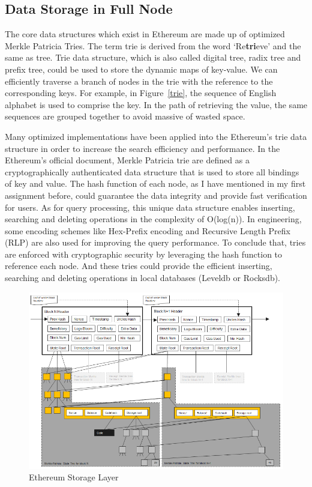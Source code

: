 \documentclass[conference]{IEEEtran}
\begin{document}
\subsection{Data Storage in Full Node}
The core data structures which exist in Ethereum are made up of optimized Merkle Patricia Tries.
%
The term trie is derived from the word `Re{\textbf{tri}}eve' and the same as tree. 
%
Trie data structure, which is also called digital tree, radix tree and prefix tree, could be used to store the dynamic maps of key-value.  
%
We can efficiently traverse a branch of nodes in the trie with the reference to the corresponding keys.
%
For example, in Figure~\ref{trie}, the sequence of English alphabet is used to comprise the key. 
%
In the path of retrieving the value, the same sequences are grouped together to avoid massive of wasted space.

Many optimized implementations have been applied into the Ethereum's trie data structure in order to increase the search efficiency and performance.
%
In the Ethereum's official document, Merkle Patricia trie are defined as a cryptographically authenticated data structure that is used to store all bindings of key and value.
%
The hash function of each node, as I have mentioned in my first assignment before, could guarantee the data integrity and provide fast verification for users.
%
As for query processing, this unique data structure enables inserting, searching and deleting operations in the complexity of O(log(n)).
%
In engineering, some encoding schemes like Hex-Prefix encoding and Recursive Length Prefix (RLP) are also used for improving the query performance.
%
To conclude that, tries are enforced with cryptographic security by leveraging the hash function to reference each node.
%
And these tries could provide the efficient inserting, searching and deleting operations in local databases (Leveldb or Rocksdb).

\begin{figure}[!t]
  \centering
  \includegraphics[width=\linewidth]{figs/Ethereum-tree.png}
  \caption{Ethereum Storage Layer}
  \label{e-trie}
\end{figure}
\end{document}
